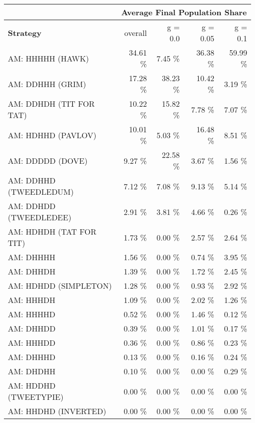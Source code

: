 \begin{tabular}{|l|r|r|r|r|}
\hline
 & \multicolumn{4}{c|}{{\bf Average Final Population Share}} \\
\hline
{\bf Strategy} & overall &  g = 0.0 & g = 0.05 & g = 0.1\\ \hline
AM: HHHHH (HAWK)             &   34.61 \%  &    7.45 \%  &   36.38 \%  &   59.99 \% \\
AM: DDHHH (GRIM)             &   17.28 \%  &   38.23 \%  &   10.42 \%  &    3.19 \% \\
AM: DDHDH (TIT FOR TAT)      &   10.22 \%  &   15.82 \%  &    7.78 \%  &    7.07 \% \\
AM: HDHHD (PAVLOV)           &   10.01 \%  &    5.03 \%  &   16.48 \%  &    8.51 \% \\
AM: DDDDD (DOVE)             &    9.27 \%  &   22.58 \%  &    3.67 \%  &    1.56 \% \\
AM: DDHHD (TWEEDLEDUM)       &    7.12 \%  &    7.08 \%  &    9.13 \%  &    5.14 \% \\
AM: DDHDD (TWEEDLEDEE)       &    2.91 \%  &    3.81 \%  &    4.66 \%  &    0.26 \% \\
AM: HDHDH (TAT FOR TIT)      &    1.73 \%  &    0.00 \%  &    2.57 \%  &    2.64 \% \\
AM: DHHHH                    &    1.56 \%  &    0.00 \%  &    0.74 \%  &    3.95 \% \\
AM: DHHDH                    &    1.39 \%  &    0.00 \%  &    1.72 \%  &    2.45 \% \\
AM: HDHDD (SIMPLETON)        &    1.28 \%  &    0.00 \%  &    0.93 \%  &    2.92 \% \\
AM: HHHDH                    &    1.09 \%  &    0.00 \%  &    2.02 \%  &    1.26 \% \\
AM: HHHHD                    &    0.52 \%  &    0.00 \%  &    1.46 \%  &    0.12 \% \\
AM: DHHDD                    &    0.39 \%  &    0.00 \%  &    1.01 \%  &    0.17 \% \\
AM: HHHDD                    &    0.36 \%  &    0.00 \%  &    0.86 \%  &    0.23 \% \\
AM: DHHHD                    &    0.13 \%  &    0.00 \%  &    0.16 \%  &    0.24 \% \\
AM: DHDHH                    &    0.10 \%  &    0.00 \%  &    0.00 \%  &    0.29 \% \\
AM: HDDHD (TWEETYPIE)        &    0.00 \%  &    0.00 \%  &    0.00 \%  &    0.00 \% \\
AM: HHDHD (INVERTED)         &    0.00 \%  &    0.00 \%  &    0.00 \%  &    0.00 \% \\

\end{tabular}
